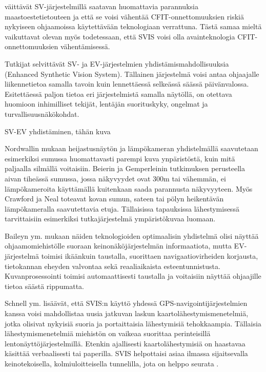 \documentclass[utf8,bachelor,manualbib]{gradu3}
\begin{document}
\cite{baileyym2007} väittävät SV-järjestelmillä saatavan huomattavia parannuksia maastoestetietouteen ja että se voisi vähentää CFIT-onnettomuuksien riskiä nykyiseen ohjaamoissa käytettävään teknologiaan verrattuna. Tästä samaa mieltä vaikuttavat olevan myös \cite{schnellym2004} todetessaan, että SVIS voisi olla avainteknologia CFIT-onnettomuuksien vähentämisessä.

Tutkijat selvittävät SV- ja EV-järjestelmien yhdistämismahdollisuuksia (Enhanced Synthetic Vision System). Tällainen järjestelmä voisi antaa ohjaajalle liikennetietoa samalla tavoin kuin lennettäessä selkeässä säässä päivänvalossa. Esitettäessä paljon tietoa eri järjestelmistä samalla näytöllä, on otettava huomioon inhimilliset tekijät, lentäjän suorituskyky, ongelmat ja turvallisuusnäkökohdat. \citep{crawfordneal2006}

SV-EV yhdistäminen, tähän kuva \citep{mollersachs1994}

Nordwallin \citeyearpar{nordwall1993} mukaan heijastusnäytön ja lämpökameran yhdistelmällä saavutetaan esimerkiksi sumussa huomattavasti parempi kuva ynpäristöstä, kuin mitä paljaalla silmällä voitaisiin. Beierin ja Gemperleinin \citeyearpar{beiergemperlein2004} tutkimuksen perusteella aivan tiheässä sumussa, jossa näkyvyydet ovat 300m tai vähemmän, ei lämpökameroita käyttämällä kuitenkaan saada parannusta näkyvyyteen. Myös Crawford ja Neal \citeyearpar{crawfordneal2006} toteavat kovan sumun, sateen tai pölyn heikentävän lämpökameralla saavutettavia etuja. Tällaisissa tapauksissa lähestymisessä tarvittaisiin esimerkiksi tutkajärjestelmä ympäristökuvaa luomaan.

Baileyn ym.\citeyearpar{baileyym2007} mukaan näiden teknologioiden optimaalisin yhdistelmä olisi näyttää ohjaamomiehistölle suoraan keinonäköjärjestelmän informaatiota, mutta EV-järjestelmä toimisi ikäänkuin taustalla, suorittaen navigaatiovirheiden korjausta, tietokannan eheyden valvontaa sekä reaaliaikaista esteentunnistusta. Kuvanprosessointi toimisi automaattisesti taustalla ja voitaisiin näyttää ohjaajille tietoa säästä rippumatta.

Schnell ym. \citeyearpar{schnellym2004} lisäävät, että SVIS:n käyttö yhdessä GPS-navigointijärjestelmien kanssa voisi mahdollistaa uusia jatkuvan laskun kaartolähestymismenetelmiä, jotka olisivat nykyisiä suoria ja portaittaisia lähestymisiä tehokkaampia. Tällaisia lähestymismenetelmiä miehistön on vaikeaa suorittaa perinteisillä lentonäyttöjärjestelmillä. Etenkin ajallisesti kaartolähestymisiä on haastavaa käsittää verbaalisesti tai paperilla. SVIS helpottaisi asiaa ilmassa sijaitsevalla keinotekoisella, kolmiuloitteisella tunnelilla, jota on helppo seurata \citep{barrowspowell1999}.
\end{document}
